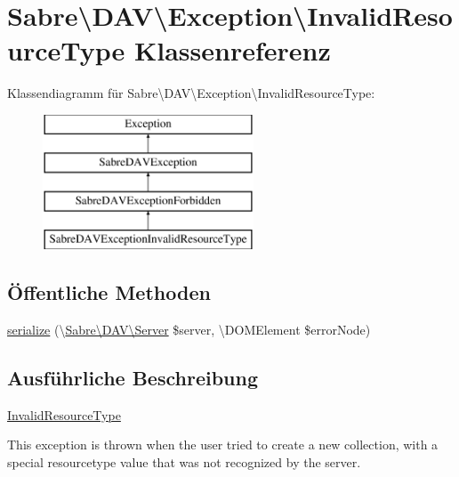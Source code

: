 \hypertarget{class_sabre_1_1_d_a_v_1_1_exception_1_1_invalid_resource_type}{}\section{Sabre\textbackslash{}D\+AV\textbackslash{}Exception\textbackslash{}Invalid\+Resource\+Type Klassenreferenz}
\label{class_sabre_1_1_d_a_v_1_1_exception_1_1_invalid_resource_type}
Klassendiagramm für Sabre\textbackslash{}D\+AV\textbackslash{}Exception\textbackslash{}Invalid\+Resource\+Type\+:\begin{figure}[H]
\begin{center}
\leavevmode
\includegraphics[height=4.000000cm]{class_sabre_1_1_d_a_v_1_1_exception_1_1_invalid_resource_type}
\end{center}
\end{figure}
\subsection*{Öffentliche Methoden}
\begin{DoxyCompactItemize}
\item 
\mbox{\hyperlink{class_sabre_1_1_d_a_v_1_1_exception_1_1_invalid_resource_type_ae9bbc8093071b78965cf0adad6394506}{serialize}} (\textbackslash{}\mbox{\hyperlink{class_sabre_1_1_d_a_v_1_1_server}{Sabre\textbackslash{}\+D\+A\+V\textbackslash{}\+Server}} \$server, \textbackslash{}D\+O\+M\+Element \$error\+Node)
\end{DoxyCompactItemize}


\subsection{Ausführliche Beschreibung}
\mbox{\hyperlink{class_sabre_1_1_d_a_v_1_1_exception_1_1_invalid_resource_type}{Invalid\+Resource\+Type}}

This exception is thrown when the user tried to create a new collection, with a special resourcetype value that was not recognized by the server.

